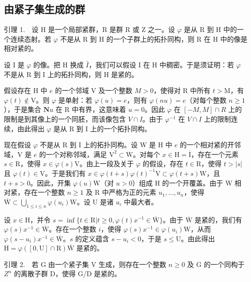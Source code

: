 \subsection{由紧子集生成的群}

引理 1.　设 H 是一个局部紧群，R 是群 R 或 Z 之一。设 \(\varphi\) 是从 R 到 H 中的一个连续态射。若 \(\varphi\) 不是从 R 到 H 的一个子群上的拓扑同构，则 R 在 H 中的像是相对紧的。

设 I 是 \(\varphi\) 的像。把 H 换成 \(\bar{I}\)，我们可以假设 I 在 H 中稠密。于是须证明：若 \(\varphi\) 不是从 R 到 I 上的拓扑同构，则 H 是紧的。

假设存在 H 中 \(e\) 的一个邻域 V 及一个整数 \(M > 0\)，使得对 R 中所有 \(t > \mathrm{M}\)，有 \(\varphi(t) \notin \mathrm{V}\)。则 \(\varphi\) 是单射：若 \(\varphi(u) = e\)，则有 \(\varphi(nu) = e\)（对每个整数 \(n \geqslant 1\)），于是集合 \(\mathbf{N}u\) 在 R 中有界，这意味着 \(u = 0\)。因此 \(\varphi\) 在 \([-M, M] \cap R\) 上的限制是到其像上的一个同胚，而该像包含 \(V \cap I\)。由于 \(\varphi^{-1}\) 在 \(V \cap I\) 上的限制连续，由此得出 \(\varphi\) 是从 R 到 I 上的一个拓扑同构。

现在假设 \(\varphi\) 不是从 R 到 I 上的拓扑同构。设 W 是 H 中 \(e\) 的一个相对紧的开邻域，V 是 \(e\) 的一个对称邻域，满足 \(\mathrm{V}^2 \subset \mathrm{W}\)。对每个 \(x \in \mathrm{H} = \overline{\mathrm{I}}\)，存在一个元素 \(s \in \mathrm{R}\)，使得 \(x \in \varphi(s)\mathrm{V}\)。由上一段及关于 \(\varphi\) 的假设，存在 \(t \in \mathrm{R}\)，使得 \(t > |s|\) 且 \(\varphi(t) \in \mathrm{V}\)。于是我们有 \(x \in \varphi(t + s)\varphi(t)^{-1}\mathrm{V} \subset \varphi(t + s)\mathrm{W}\)，且 \(t + s > 0\)。因此，开集 \(\varphi(u)\mathrm{W}\)（对 \(u > 0\)）组成 H 的一个开覆盖。由于 W 相对紧，存在一个整数 \(n \geqslant 1\) 及 R 中严格为正的元素 \(u_1, \ldots, u_n\)，使得 \(\overline{\mathrm{W}} \subset \bigcup_{1 \leqslant i \leqslant n} \varphi(u_i)\mathrm{W}\)。设 U 是诸 \(u_i\) 中最大者。

设 \(x \in \mathrm{H}\)，并令 \(s = \inf \{t \in \mathrm{R} | t \geqslant 0, \varphi(t)x^{-1} \in \overline{\mathrm{W}}\}\)。由于 \(\overline{\mathrm{W}}\) 是紧的，我们有 \(\varphi(s)x^{-1} \in \overline{\mathrm{W}}\)。存在一个整数 \(i\)，使得 \(\varphi(s)x^{-1} \in \varphi(u_i)\mathrm{W}\)，从而 \(\varphi(s - u_i)x^{-1} \in \overline{\mathrm{W}}\)。\(s\) 的定义蕴含 \(s - u_i < 0\)，于是 \(s \leqslant \mathrm{U}\)。由此得出 \(\mathrm{H} = \varphi([0,\mathrm{U}] \cap \mathrm{R})\overline{\mathrm{W}}\) 是紧的。

引理 2.　若 G 由一个紧子集 V 生成，则存在一个整数 \(n \geqslant 0\) 及 G 的一个同构于 \(Z^{n}\) 的离散子群 D，使得 G/D 是紧的。

